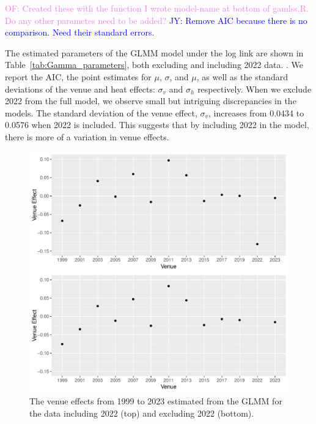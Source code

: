 \documentclass[12pt, letterpaper]{article}
\newcommand{\jy}[1]{\textcolor{blue}{JY: #1}}
\newcommand{\of}[1]{\textcolor{violet}{OF: #1}}
\begin{document}
\of{Created these with the function I wrote model-name at bottom of gamlss.R. Do
  any other parametes need to be added?}
\jy{Remove AIC because there is no comparison. Need their standard errors.}

The estimated parameters of the GLMM model under the log link are shown in 
Table~\ref{tab:Gamma_parameters}, both excluding and including 2022 data.
.  We report the AIC, the point estimates for $\mu$,
$\sigma$, and $\mu$, as well as the standard deviations of the venue and heat
effects: $\sigma_v$ and $\sigma_h$ respectively. When we exclude 2022 from the
full model, we observe small but intriguing discrepancies in the models. The
standard deviation of the venue effect, $\sigma_v$, increases from 0.0434 to
0.0576 when 2022 is included. This suggests that by including 2022 in the model,
there is more of a variation in venue effects.



\begin{figure}[tbp]
  \centering
  \includegraphics{ComparisonOfVenueEffects}
  \caption{The venue effects from 1999 to 2023 estimated from the GLMM for the
    data including 2022 (top) and excluding 2022 (bottom).}
  \label{fig:VenueEffects}
\end{figure}
\end{document}
